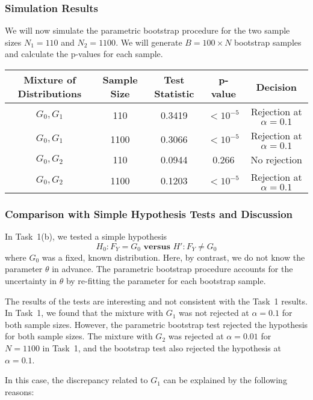 \documentclass{article}
\begin{document}
\subsubsection{Simulation Results}

We will now simulate the parametric bootstrap procedure for the two sample sizes \(N_1 = 110\) and \(N_2 = 1100\). We will generate \(B = 100 \times N\) bootstrap samples and calculate the p-values for each sample.

\begin{table}[h]
\centering
\begin{tabular}{|c|c|c|c|c|}
\hline
\textbf{Mixture of Distributions} & \textbf{Sample Size} & \textbf{Test Statistic} & \textbf{p-value} & \textbf{Decision} \\ \hline
\(G_0, G_1\) & 110 & 0.3419 & \(< 10^{-5}\) & Rejection at \(\alpha=0.1\) \\ \hline
\(G_0, G_1\) & 1100 & 0.3066 & \(< 10^{-5}\) & Rejection at \(\alpha=0.1\) \\ \hline
\(G_0, G_2\) & 110 & 0.0944 & 0.266 & No rejection \\ \hline
\(G_0, G_2\) & 1100 & 0.1203 & \(< 10^{-5}\) & Rejection at \(\alpha=0.1\) \\ \hline
\end{tabular}
\end{table}

\subsubsection{Comparison with Simple Hypothesis Tests and Discussion}

In Task~1(b), we tested a simple hypothesis
\[
H_0: F_Y = G_0 \textbf{ versus } H': F_Y \neq G_0
\]
where \(G_0\) was a fixed, known distribution. Here, by contrast, we do not know the parameter \(\theta\) in advance. The parametric bootstrap procedure accounts for the uncertainty in \(\theta\) by re-fitting the parameter for each bootstrap sample.

The results of the tests are interesting and not consistent with the Task~1 results. In Task~1, we found that the mixture with \(G_1\) was not rejected at \(\alpha=0.1\) for both sample sizes. However, the parametric bootstrap test rejected the hypothesis for both sample sizes. The mixture with \(G_2\) was rejected at \(\alpha=0.01\) for \(N=1100\) in Task~1, and the bootstrap test also rejected the hypothesis at \(\alpha=0.1\).

In this case, the discrepancy related to \(G_1\) can be explained by the following reasons:
\end{document}

